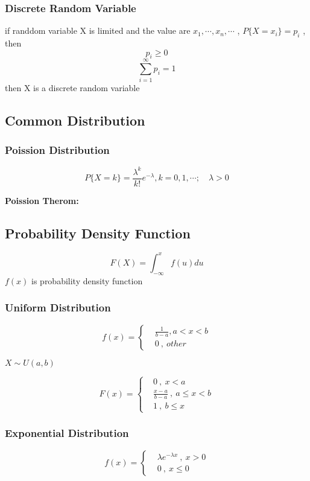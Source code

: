 \documentclass{ctexart}
\begin{document}
\vspace{12 pt}
\subsubsection{Discrete Random Variable}
if randdom variable X is limited and the value are \(x_1,\cdots ,x_n ,\cdots\) , \(P\{X=x_i\}=p_i\) , then 
\[p_i\geq 0\]
\[\sum_{i=1}^{\infty}p_i=1\]
then X is a discrete random variable

\vspace{12 pt}
\subsection{Common Distribution}
\subsubsection{Poission Distribution}
\[P\{X=k\}=\frac{\lambda^k}{k!}e^{-\lambda},k=0,1,\cdots ;\quad \lambda >0\]

\textbf{Poission Therom:}


\subsection{Probability Density Function}
\[F(X)=\int^{x}_{-\infty}f(u)du\]
\(f(x)\) is probability density function

\vspace{ 12 pt}
\subsubsection{Uniform Distribution}

\[ f(x)=\left\{
\begin{aligned}
&\frac{1}{b-a},a<x<b \\
&0 \ , \ other
\end{aligned}
\right.
\]

\(X\sim U(a,b)\)

\[
F(x)=\left\{
\begin{aligned}
&0 \ , \ x<a \\
&\frac{x-a}{b-a}\ , \ a\leq x <b \\
&1\ , \ b\leq x
\end{aligned}
\right.
\]

\subsubsection{Exponential Distribution}
\[
f(x)=\left\{
\begin{aligned}
&\lambda e^{-\lambda x}\ , \ x>0 \\
&0 \  , \ x\leq 0
\end{aligned}
\right.
\]
\end{document}
